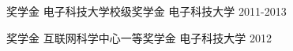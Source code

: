 



\begin{cvhonors}

  \cvhonor
    {奖学金} %
    {电子科技大学校级奖学金} %
    {电子科技大学} %
    {2011-2013} %

  \cvhonor
    {奖学金} %
    {互联网科学中心一等奖学金} %
    {电子科技大学} %
    {2012} %

\end{cvhonors}
